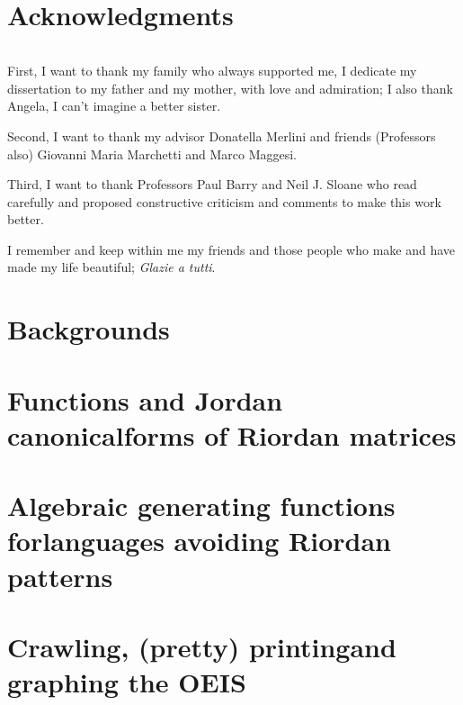 \documentclass[a4paper,10pt]{tufte-book}
\begin{document}
\cleardoublepage

\chapter*{Acknowledgments}

$\quad$

First, I want to thank my family who always supported me, I dedicate my
dissertation to my father and my mother, with love and admiration; I also thank
Angela, I can't imagine a better sister. 

Second, I want to thank my advisor Donatella Merlini and friends (Professors
also) Giovanni Maria Marchetti and Marco Maggesi.

Third, I want to thank Professors Paul Barry and Neil J. Sloane who read
carefully and proposed constructive criticism and comments to make this work
better.

I remember and keep within me my friends and those people who make and have
made my life beautiful; \textit{Glazie a tutti}.

\cleardoublepage



\cleardoublepage

\chapter{Backgrounds}
\label{ch:backgrounds}



\chapter{Functions and Jordan canonical\newline forms of Riordan matrices}
\label{ch:Riordan-matrices-function}



\chapter{Algebraic generating functions for\newline languages avoiding Riordan patterns}
\label{ch:algebraic-gfs-languages-avoiding-Riordan-patterns}



\chapter{Crawling, (pretty) printing\newline and graphing the OEIS}
\label{ch:OEIS:tools}
\end{document}

